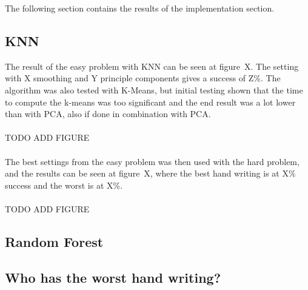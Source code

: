 \documentclass[report]{subfiles}
\begin{document}
The following section contains the results of the implementation section.

\subsection{KNN}
The result of the easy problem with KNN can be seen at figure~X. The setting with X smoothing and Y principle components gives a success of Z\%. The algorithm was also tested with K-Means, but initial testing shown that the time to compute the k-means was too significant and the end result was a lot lower than with PCA, also if done in combination with PCA.\\
\\TODO ADD FIGURE\\\\
The best settings from the easy problem was then used with the hard problem, and the results can be seen at figure~X, where the best hand writing is at X\% success and the worst is at X\%.\\
\\TODO ADD FIGURE

\subsection{Random Forest}

\subsection{Who has the worst hand writing?}
\end{document}
